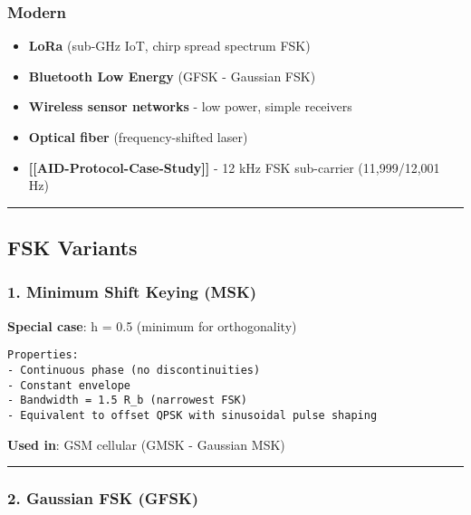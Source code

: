 \subsubsection{Modern}\label{modern}

\begin{itemize}
\tightlist
\item
  \textbf{LoRa} (sub-GHz IoT, chirp spread spectrum FSK)
\item
  \textbf{Bluetooth Low Energy} (GFSK - Gaussian FSK)
\item
  \textbf{Wireless sensor networks} - low power, simple receivers
\item
  \textbf{Optical fiber} (frequency-shifted laser)
\item
  \textbf{{[}{[}AID-Protocol-Case-Study{]}{]}} - 12 kHz FSK sub-carrier
  (11,999/12,001 Hz)
\end{itemize}

\begin{center}\rule{0.5\linewidth}{0.5pt}\end{center}

\subsection{\texorpdfstring{ FSK
Variants}{ FSK Variants}}\label{fsk-variants}

\subsubsection{1. Minimum Shift Keying
(MSK)}\label{minimum-shift-keying-msk}

\textbf{Special case}: h = 0.5 (minimum for orthogonality)

\begin{verbatim}
Properties:
- Continuous phase (no discontinuities)
- Constant envelope
- Bandwidth = 1.5 R_b (narrowest FSK)
- Equivalent to offset QPSK with sinusoidal pulse shaping
\end{verbatim}

\textbf{Used in}: GSM cellular (GMSK - Gaussian MSK)

\begin{center}\rule{0.5\linewidth}{0.5pt}\end{center}

\subsubsection{2. Gaussian FSK (GFSK)}\label{gaussian-fsk-gfsk}

